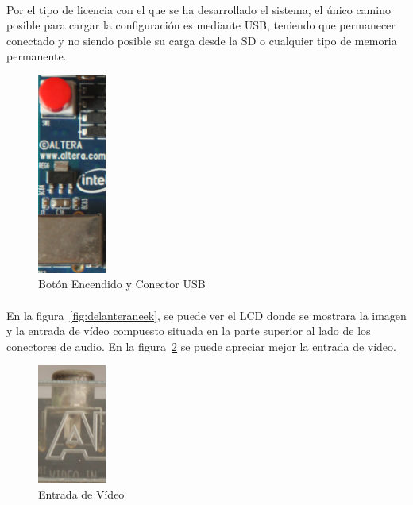 \documentclass[a4paper,12pt,titlepage,final]{book}
\begin{document}
\paragraph{}
Por el tipo de licencia con el que se ha desarrollado el sistema, el único camino posible para cargar la configuración es mediante USB, teniendo que permanecer conectado y no siendo posible su carga desde la SD o cualquier tipo de memoria permanente.

\begin{figure}[p]
\centering
\includegraphics[width=0.2\textwidth]{./figuras/NEEK/BotonPowerUSB.png}
\caption{Botón Encendido y Conector USB}
\label{fig:botonusb}
\end{figure}

\paragraph{}
En la figura~\ref{fig:delanteraneek}, se puede ver el LCD donde se mostrara la imagen y la entrada de vídeo compuesto situada en la parte superior al lado de los conectores de audio. En la figura~\ref{fig:VIN} se puede apreciar mejor la entrada de vídeo.  

\begin{figure}[p]
\centering
\includegraphics[width=0.20\textwidth]{./figuras/NEEK/VIN.png}
\caption{Entrada de Vídeo}
\label{fig:VIN}
\end{figure}
\end{document}
